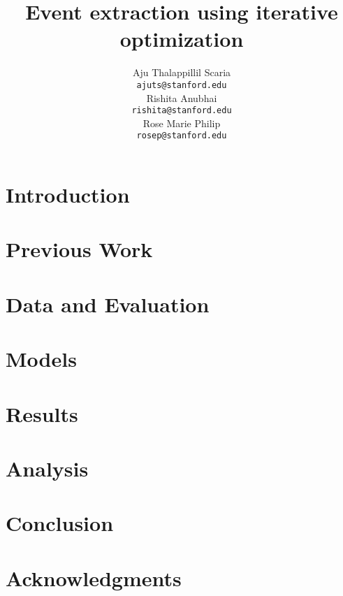 \documentclass[11pt]{article}
\title{Event extraction using iterative optimization}
\author{
   Aju Thalappillil Scaria \\
  {\tt ajuts@stanford.edu} \\\And
  Rishita Anubhai \\
  {\tt rishita@stanford.edu} \\\And
  Rose Marie Philip \\
  {\tt rosep@stanford.edu} 
\\}
\date{}
\begin{document}
\maketitle
\begin{abstract}

\end{abstract}

\section{Introduction}
\label{sec:introduction}


\section{Previous Work}
\label{sec:previousapproaches}


\section{Data and Evaluation}
\label{sec:data}


\section{Models}
\label{sec:model}

\label{sec:model}

\label{sec:model}

\label{sec:model}

\label{sec:model}


\section{Results}
\label{sec:results}


\section{Analysis}
\label{sec:analysis}


\section{Conclusion}
\label{sec:conclusion}


\section*{Acknowledgments}
\end{document}
